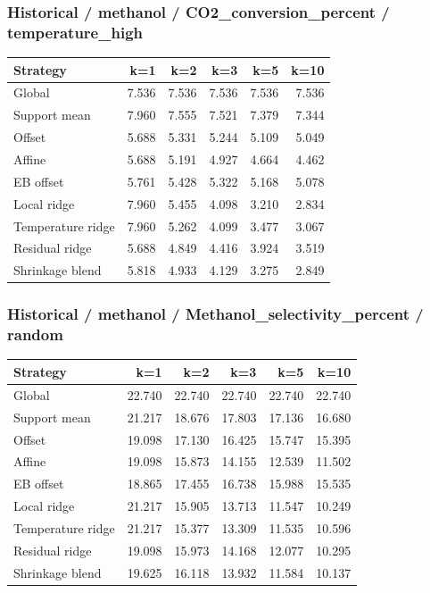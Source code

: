 \subsubsection*{Historical / methanol / CO2\_conversion\_percent / temperature\_high}
\begin{center}\small
\begin{tabular}{lrrrrr}
\toprule
Strategy & k=1 & k=2 & k=3 & k=5 & k=10 \\
\midrule
Global & 7.536 & 7.536 & 7.536 & 7.536 & 7.536 \\
Support mean & 7.960 & 7.555 & 7.521 & 7.379 & 7.344 \\
Offset & 5.688 & 5.331 & 5.244 & 5.109 & 5.049 \\
Affine & 5.688 & 5.191 & 4.927 & 4.664 & 4.462 \\
EB offset & 5.761 & 5.428 & 5.322 & 5.168 & 5.078 \\
Local ridge & 7.960 & 5.455 & 4.098 & 3.210 & 2.834 \\
Temperature ridge & 7.960 & 5.262 & 4.099 & 3.477 & 3.067 \\
Residual ridge & 5.688 & 4.849 & 4.416 & 3.924 & 3.519 \\
Shrinkage blend & 5.818 & 4.933 & 4.129 & 3.275 & 2.849 \\
\bottomrule
\end{tabular}
\end{center}

\subsubsection*{Historical / methanol / Methanol\_selectivity\_percent / random}
\begin{center}\small
\begin{tabular}{lrrrrr}
\toprule
Strategy & k=1 & k=2 & k=3 & k=5 & k=10 \\
\midrule
Global & 22.740 & 22.740 & 22.740 & 22.740 & 22.740 \\
Support mean & 21.217 & 18.676 & 17.803 & 17.136 & 16.680 \\
Offset & 19.098 & 17.130 & 16.425 & 15.747 & 15.395 \\
Affine & 19.098 & 15.873 & 14.155 & 12.539 & 11.502 \\
EB offset & 18.865 & 17.455 & 16.738 & 15.988 & 15.535 \\
Local ridge & 21.217 & 15.905 & 13.713 & 11.547 & 10.249 \\
Temperature ridge & 21.217 & 15.377 & 13.309 & 11.535 & 10.596 \\
Residual ridge & 19.098 & 15.973 & 14.168 & 12.077 & 10.295 \\
Shrinkage blend & 19.625 & 16.118 & 13.932 & 11.584 & 10.137 \\
\bottomrule
\end{tabular}
\end{center}


